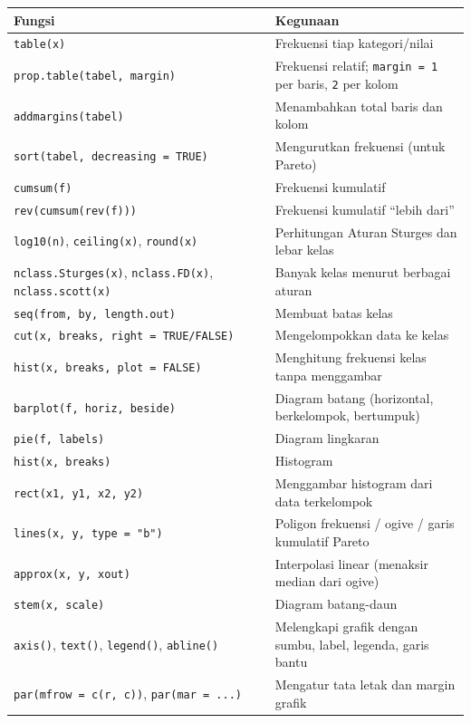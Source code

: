 \documentclass[
  indonesian,
  letterpaper,
]{book}
\newcounter{none} %
\begin{document}
{\def\LTcaptype{none} %
\begin{longtable}[]{@{}
  >{\raggedright\arraybackslash}p{}
  >{\raggedright\arraybackslash}p{}@{}}
\toprule\noalign{}
\begin{minipage}[b]{\linewidth}\raggedright
Fungsi
\end{minipage} & \begin{minipage}[b]{\linewidth}\raggedright
Kegunaan
\end{minipage} \\
\midrule\noalign{}
\endhead
\bottomrule\noalign{}
\endlastfoot
\texttt{table(x)} & Frekuensi tiap kategori/nilai \\
\texttt{prop.table(tabel,\ margin)} & Frekuensi relatif;
\texttt{margin\ =\ 1} per baris, \texttt{2} per kolom \\
\texttt{addmargins(tabel)} & Menambahkan total baris dan kolom \\
\texttt{sort(tabel,\ decreasing\ =\ TRUE)} & Mengurutkan frekuensi
(untuk Pareto) \\
\texttt{cumsum(f)} & Frekuensi kumulatif \\
\texttt{rev(cumsum(rev(f)))} & Frekuensi kumulatif ``lebih dari'' \\
\texttt{log10(n)}, \texttt{ceiling(x)}, \texttt{round(x)} & Perhitungan
Aturan Sturges dan lebar kelas \\
\texttt{nclass.Sturges(x)}, \texttt{nclass.FD(x)},
\texttt{nclass.scott(x)} & Banyak kelas menurut berbagai aturan \\
\texttt{seq(from,\ by,\ length.out)} & Membuat batas kelas \\
\texttt{cut(x,\ breaks,\ right\ =\ TRUE/FALSE)} & Mengelompokkan data ke
kelas \\
\texttt{hist(x,\ breaks,\ plot\ =\ FALSE)} & Menghitung frekuensi kelas
tanpa menggambar \\
\texttt{barplot(f,\ horiz,\ beside)} & Diagram batang (horizontal,
berkelompok, bertumpuk) \\
\texttt{pie(f,\ labels)} & Diagram lingkaran \\
\texttt{hist(x,\ breaks)} & Histogram \\
\texttt{rect(x1,\ y1,\ x2,\ y2)} & Menggambar histogram dari data
terkelompok \\
\texttt{lines(x,\ y,\ type\ =\ "b")} & Poligon frekuensi / ogive / garis
kumulatif Pareto \\
\texttt{approx(x,\ y,\ xout)} & Interpolasi linear (menaksir median dari
ogive) \\
\texttt{stem(x,\ scale)} & Diagram batang-daun \\
\texttt{axis()}, \texttt{text()}, \texttt{legend()}, \texttt{abline()} &
Melengkapi grafik dengan sumbu, label, legenda, garis bantu \\
\texttt{par(mfrow\ =\ c(r,\ c))}, \texttt{par(mar\ =\ ...)} & Mengatur
tata letak dan margin grafik \\
\end{longtable}
}
\end{document}
